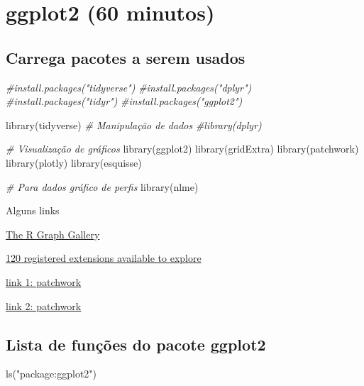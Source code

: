\documentclass[
]{book}
\newenvironment{Shaded}{\begin{snugshade}}{\end{snugshade}}
\newcommand{\CommentTok}[1]{\textcolor[rgb]{0.56,0.35,0.01}{\textit{#1}}}
\newcommand{\FunctionTok}[1]{\textcolor[rgb]{0.00,0.00,0.00}{#1}}
\newcommand{\NormalTok}[1]{#1}
\newcommand{\StringTok}[1]{\textcolor[rgb]{0.31,0.60,0.02}{#1}}
\begin{document}
\hypertarget{ggplot2-60-minutos}{%
\chapter{ggplot2 (60 minutos)}\label{ggplot2-60-minutos}}

\hypertarget{carrega-pacotes-a-serem-usados-2}{%
\section{Carrega pacotes a serem usados}\label{carrega-pacotes-a-serem-usados-2}}

\begin{Shaded}
\begin{Highlighting}[]
\CommentTok{\#install.packages("tidyverse") }
\CommentTok{\#install.packages("dplyr")     }
\CommentTok{\#install.packages("tidyr")     }
\CommentTok{\#install.packages("ggplot2")   }

\FunctionTok{library}\NormalTok{(tidyverse)}
\CommentTok{\# Manipulação de dados}
\CommentTok{\#library(dplyr)}

\CommentTok{\# Visualização de gráficos}
\FunctionTok{library}\NormalTok{(ggplot2)}
\FunctionTok{library}\NormalTok{(gridExtra)}
\FunctionTok{library}\NormalTok{(patchwork)}
\FunctionTok{library}\NormalTok{(plotly)}
\FunctionTok{library}\NormalTok{(esquisse)}

\CommentTok{\# Para dados gráfico de perfis}
\FunctionTok{library}\NormalTok{(nlme)}
\end{Highlighting}
\end{Shaded}

Alguns links

\href{https://r-graph-gallery.com/}{The R Graph Gallery}

\href{https://exts.ggplot2.tidyverse.org/gallery/}{120 registered extensions available to explore}

\href{https://patchwork.data-imaginist.com/articles/guides/assembly.html}{link 1: patchwork}

\href{https://patchwork.data-imaginist.com/articles/patchwork.html}{link 2: patchwork}

\hypertarget{lista-de-funuxe7uxf5es-do-pacote-ggplot2}{%
\section{Lista de funções do pacote ggplot2}\label{lista-de-funuxe7uxf5es-do-pacote-ggplot2}}

\begin{Shaded}
\begin{Highlighting}[]
\FunctionTok{ls}\NormalTok{(}\StringTok{"package:ggplot2"}\NormalTok{)}
\end{Highlighting}
\end{Shaded}
\end{document}
